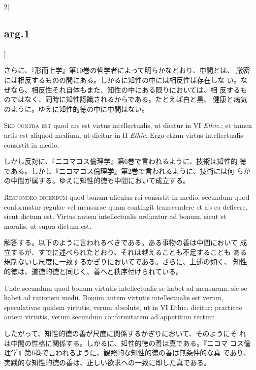 \documentclass[paper=a4paper,fontsize=10pt,jafontsize=9pt,titlepage]{jlreq}
\begin{document}
\begin{paracol}{2}[\subsection{arg.1}]
\switchcolumn

さらに、『形而上学』第10巻の哲学者によって明らかなとおり、中間とは、
 厳密には相反するものの間にある。しかるに知性の中には相反性は存在しな
 い。なぜなら、相反性それ自体もまた、知性の中にある限りにおいては、相
 反するものではなく、同時に知性認識されるからである。たとえば白と黒、
 健康と病気のように。ゆえに知性的徳の中に中間はない。

\switchcolumn*[\subsection{s.c.}]

{\scshape Sed contra est} quod ars est virtus intellectualis, ut
dicitur in VI {\itshape Ethic}.; et tamen artis est aliquod medium, ut
dicitur in II {\itshape Ethic}. Ergo etiam virtus intellectualis
consistit in medio.

\switchcolumn

しかし反対に、『ニコマコス倫理学』第6巻で言われるように、技術は知性的
 徳である。しかし『ニコマコス倫理学』第2巻で言われるように、技術には何
 らかの中間が属する。ゆえに知性的徳も中間において成立する。


{\scshape Respondeo dicendum} quod bonum alicuius rei consistit in
medio, secundum quod conformatur regulae vel mensurae quam contingit
transcendere et ab ea deficere, sicut dictum est. Virtus autem
intellectualis ordinatur ad bonum, sicut et moralis, ut supra dictum
est.

\switchcolumn

解答する。以下のように言われるべきである。ある事物の善は中間において
 成立するが、すでに述べられたとおり、それは越えることも不足することも
 ある規制ないし尺度に一致するかぎりにおいてである。さらに、上述の如く、
 知性的徳は、道徳的徳と同じく、善へと秩序付けられている。

\switchcolumn*

Unde secundum quod bonum virtutis intellectualis se habet ad
 mensuram, sic se habet ad rationem medii. Bonum autem virtutis
 intellectualis est verum, speculativae quidem virtutis, verum
 absolute, ut in VI Ethic. dicitur; practicae autem virtutis, verum
 secundum conformitatem ad appetitum rectum.

\switchcolumn

したがって、知性的徳の善が尺度に関係するかぎりにおいて、そのようにそ
 れは中間の性格に関係する。しかるに、知性的徳の善は真である。『ニコマ
 コス倫理学』第6巻で言われるように、観照的な知性的徳の善は無条件的な真
 であり、実践的な知性的徳の善は、正しい欲求への一致に即した真である。


\end{paracol}
\end{document}

